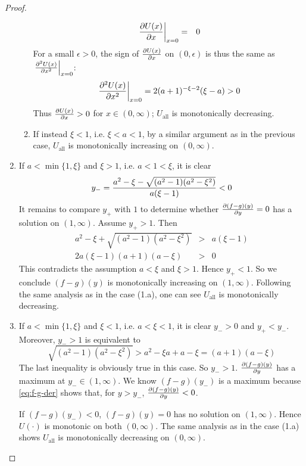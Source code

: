 \documentclass[11pt,a4]{amsart}
\newcommand{\pd}{\partial}
\newcommand{\1}{{\mathbf 1}}
\begin{document}
\begin{proof}
\begin{enumerate}
\begin{enumerate}
        \begin{eqnarray*}
          \left.{\pd U(x) \over \pd x}\right|_{x=0} &=& 0 \\
        \end{eqnarray*}
        For a small $\epsilon > 0$, the sign of ${\pd U(x) \over \pd
          x}$ on $(0, \epsilon)$ is thus the same as
        $\left.{\pd^2 U(x) \over \pd x^2}\right|_{x=0}$:
        \[
        \left.{\pd^2 U(x) \over \pd x^2}\right|_{x=0} =
        2 (a + 1)^{-\xi - 2} (\xi - a) > 0
        \]
        Thus ${\pd U(x) \over \pd x} > 0$ for $x \in (0, \infty)$;
        $U_{\text{all}}$ is monotonically decreasing.
    \item If instead $\xi < 1$, i.e. $\xi < a < 1$, by a similar
      argument as in the previous case, $U_{\text{all}}$ is monotonically
      increasing on $(0, \infty)$.
    \end{enumerate}
  \item If $a < \min\{1, \xi\}$ and $\xi > 1$, i.e. $a < 1 < \xi$, it
    is clear
    \[
    y_- = {
      a^2 - \xi - \sqrt{(a^2 - 1) (a^2 - \xi^2)}
      \over
      a (\xi - 1)
    } < 0
    \]
    It remains to compare $y_+$ with $1$ to determine whether
    ${\pd (f -g)(y) \over \pd y} = 0$ has a solution on $(1, \infty)$.
    Assume $y_+ > 1$. Then
    \begin{eqnarray}
      a^2 - \xi + \sqrt{(a^2 - 1) (a^2 - \xi^2)} &>& a (\xi - 1)
      \nonumber \\
      2 a (\xi - 1) (a + 1) (a - \xi) &>& 0 \label{eq:mi6}
    \end{eqnarray}
    This contradicts the assumption $a < \xi$ and $\xi > 1$. Hence
    $y_+ < 1$. So we conclude $(f - g)(y)$ is monotonically increasing
    on $(1, \infty)$. Following the same analysis as in the case
    (1.a), one can see $U_{\text{all}}$ is monotonically decreasing.

  \item If $a < \min\{1, \xi\}$ and $\xi < 1$, i.e. $a < \xi < 1$, it
    is clear $y_- > 0$ and $y_+ < y_-$. Moreover, $y_- > 1$ is equivalent
    to
    \[
    \sqrt{(a^2 - 1) (a^2 - \xi^2)} > a^2 - \xi a + a - \xi
    = (a + 1) (a - \xi)
    \]
    The last inequality is obviously true in this case. So $y_- >
    1$. ${\pd (f-g)(y) \over \pd y}$ has a maximum at
    $y_- \in (1, \infty)$. We know $(f - g)(y_-)$ is a maximum because
    \eqref{eq:f-g-der} shows that, for $y > y_-$,
    ${\pd (f-g)(y) \over \pd y} < 0$.

    If $(f-g)(y_-) < 0$, $(f-g)(y) = 0$ has no solution on $(1,
    \infty)$. Hence $U(\cdot)$ is monotonic on both $(0, \infty)$.
    The same analysis as in the case (1.a) shows $U_{\text{all}}$
    is monotonically decreasing on $(0, \infty)$.


\end{enumerate}
\end{proof}
\end{document}
